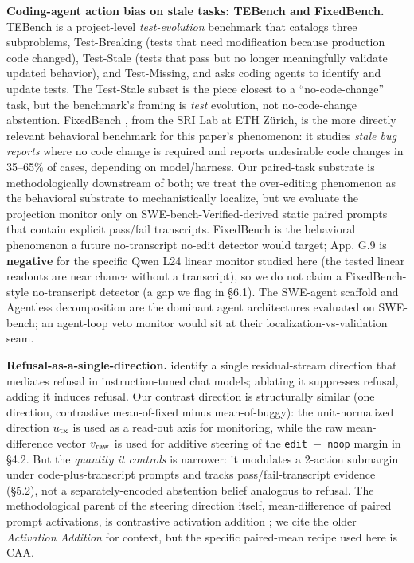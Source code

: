 \documentclass[
  11pt,
  a4paper]{article}
\begin{document}
\textbf{Coding-agent action bias on stale tasks: TEBench and
FixedBench.} TEBench \citep{shang2026tebench} is a project-level
\emph{test-evolution} benchmark that catalogs three subproblems,
Test-Breaking (tests that need modification because production code
changed), Test-Stale (tests that pass but no longer meaningfully
validate updated behavior), and Test-Missing, and asks coding agents to
identify and update tests. The Test-Stale subset is the piece closest to
a ``no-code-change'' task, but the benchmark's framing is \emph{test}
evolution, not no-code-change abstention. FixedBench
\citep{fixedbench2025}, from the SRI Lab at ETH Zürich, is the more
directly relevant behavioral benchmark for this paper's phenomenon: it
studies \emph{stale bug reports} where no code change is required and
reports undesirable code changes in 35--65\% of cases, depending on
model/harness. Our paired-task substrate is methodologically downstream
of both; we treat the over-editing phenomenon as the behavioral
substrate to mechanistically localize, but we evaluate the projection
monitor only on SWE-bench-Verified-derived static paired prompts that
contain explicit pass/fail transcripts. FixedBench is the behavioral
phenomenon a future no-transcript no-edit detector would target; App.
G.9 is \textbf{negative} for the specific Qwen L24 linear monitor
studied here (the tested linear readouts are near chance without a
transcript), so we do not claim a FixedBench-style no-transcript
detector (a gap we flag in \S{}6.1). The SWE-agent scaffold
\citep{yang2024sweagent} and Agentless decomposition
\citep{xia2024agentless} are the dominant agent architectures evaluated
on SWE-bench; an agent-loop veto monitor would sit at their
localization-vs-validation seam.

\textbf{Refusal-as-a-single-direction.} \citet{arditi2024refusal}
identify a single residual-stream direction that mediates refusal in
instruction-tuned chat models; ablating it suppresses refusal, adding it
induces refusal. Our contrast direction is structurally similar (one
direction, contrastive mean-of-fixed minus mean-of-buggy): the
unit-normalized direction \(u_{\rm tx}\) is used as a read-out axis for
monitoring, while the raw mean-difference vector \(v_{\rm raw}\) is used
for additive steering of the \texttt{edit\ \ensuremath{-}\ noop} margin in \S{}4.2. But
the \emph{quantity it controls} is narrower: it modulates a 2-action
submargin under code-plus-transcript prompts and tracks
pass/fail-transcript evidence (\S{}5.2), not a separately-encoded
abstention belief analogous to refusal. The methodological parent of the
steering direction itself, mean-difference of paired prompt activations,
is contrastive activation addition \citep{rimsky2024caa}; we cite the
older \emph{Activation Addition} \citep{turner2023actadd} for context,
but the specific paired-mean recipe used here is CAA.
\end{document}
